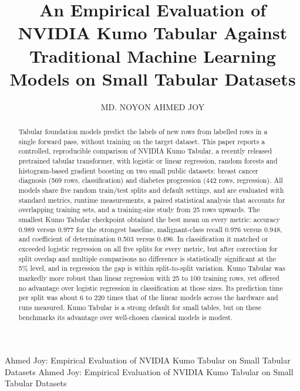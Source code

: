 \documentclass{ieeeaccess}
\begin{document}

\title{An Empirical Evaluation of NVIDIA Kumo Tabular Against Traditional Machine Learning Models on Small Tabular Datasets}
\author{\uppercase{MD. Noyon Ahmed Joy}}
\address{Independent Researcher, Bangladesh (ORCID iD: 0009-0004-9225-4610, \url{https://orcid.org/0009-0004-9225-4610})}

\markboth
{Ahmed Joy: Empirical Evaluation of NVIDIA Kumo Tabular on Small Tabular Datasets}
{Ahmed Joy: Empirical Evaluation of NVIDIA Kumo Tabular on Small Tabular Datasets}



\begin{abstract}
Tabular foundation models predict the labels of new rows from labelled rows in a single forward pass, without training on the target dataset. This paper reports a controlled, reproducible comparison of NVIDIA Kumo Tabular, a recently released pretrained tabular transformer, with logistic or linear regression, random forests and histogram-based gradient boosting on two small public datasets: breast cancer diagnosis (569 rows, classification) and diabetes progression (442 rows, regression). All models share five random train/test splits and default settings, and are evaluated with standard metrics, runtime measurements, a paired statistical analysis that accounts for overlapping training sets, and a training-size study from 25 rows upwards. The smallest Kumo Tabular checkpoint obtained the best mean on every metric: accuracy 0.989 versus 0.977 for the strongest baseline, malignant-class recall 0.976 versus 0.948, and coefficient of determination 0.503 versus 0.496. In classification it matched or exceeded logistic regression on all five splits for every metric, but after correction for split overlap and multiple comparisons no difference is statistically significant at the 5\% level, and in regression the gap is within split-to-split variation. Kumo Tabular was markedly more robust than linear regression with 25 to 100 training rows, yet offered no advantage over logistic regression in classification at those sizes. Its prediction time per split was about 6 to 220 times that of the linear models across the hardware and runs measured. Kumo Tabular is a strong default for small tables, but on these benchmarks its advantage over well-chosen classical models is modest.
\end{abstract}
\end{document}
